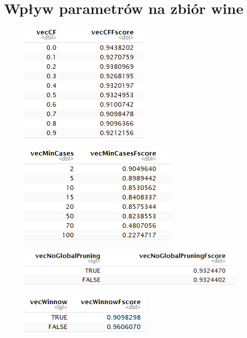 \documentclass[12pt,a4paper]{article}
\begin{document}
\section{Wpływ parametrów na zbiór wine}

\begin{figure}[H]
\centering
\includegraphics{wineDTCF.PNG}
\end{figure}

\begin{figure}[H]
\centering
\includegraphics{wineDTminCases.png}
\end{figure}

\begin{figure}[H]
\centering
\includegraphics{wineDTnoGlobalPruning.PNG}
\end{figure}

\begin{figure}[H]
\centering
\includegraphics{WineDTwinnow.PNG}
\end{figure}
\end{document}
